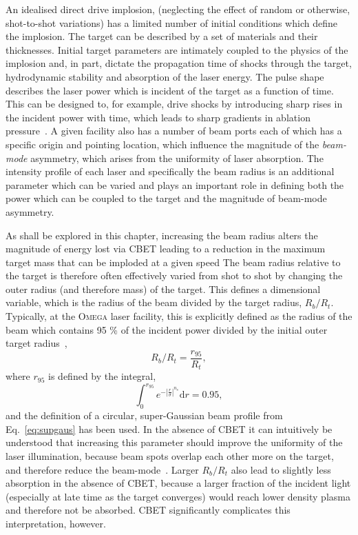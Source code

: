 An idealised direct drive implosion, (neglecting the effect of random or otherwise, shot-to-shot variations) has a limited number of initial conditions which define the implosion.
The target can be described by a set of materials and their thicknesses.
Initial target parameters are intimately coupled to the physics of the implosion and, in part, dictate the propagation time of shocks through the target, hydrodynamic stability and absorption of the laser energy.
The pulse shape describes the laser power which is incident of the target as a function of time.
This can be designed to, for example, drive shocks by introducing sharp rises in the incident power with time, which leads to sharp gradients in ablation pressure~\cite{scott_shock-augmented_2022}.
A given facility also has a number of beam ports each of which has a specific origin and pointing location, which influence the magnitude of the \textit{beam-mode} asymmetry, which arises from the uniformity of laser absorption.
The intensity profile of each laser and specifically the beam radius is an additional parameter which can be varied and plays an important role in defining both the power which can be coupled to the target and the magnitude of beam-mode asymmetry.

As shall be explored in this chapter, increasing the beam radius alters the magnitude of energy lost via \ac{CBET} leading to a reduction in the maximum target mass that can be imploded at a given speed
The beam radius relative to the target is therefore often effectively varied from shot to shot by changing the outer radius (and therefore mass) of the target.
This defines a dimensional variable, which is the radius of the beam divided by the target radius, $R_b/R_t$.
Typically, at the \textsc{Omega} laser facility, this is explicitly defined as the radius of the beam which contains 95 \% of the incident power divided by the initial outer target radius~\cite{froula_increasing_2012,colaitis_exploration_2023,anderson_enhanced_2024},
\begin{equation}
    R_b/R_t = \frac{r_{95}}{R_t},
\end{equation}
where $r_{95}$ is defined by the integral,
\begin{equation}
    \label{eq:Res1_r95}
    \int_0^{r_{95}}e^{- \left| \frac{r}{\sigma} \right| ^{n_s}}\text{d}r = 0.95,
\end{equation}
and the definition of a circular, super-Gaussian beam profile from Eq.~\ref{eq:supgaus} has been used.
In the absence of \ac{CBET} it can intuitively be understood that increasing this parameter should improve the uniformity of the laser illumination, because beam spots overlap each other more on the target, and therefore reduce the beam-mode~\cite{lees_understanding_2023}.
Larger $R_b/R_t$ also lead to slightly less absorption in the absence of \ac{CBET}, because a larger fraction of the incident light (especially at late time as the target converges) would reach lower density plasma and therefore not be absorbed.
\ac{CBET} significantly complicates this interpretation, however.

